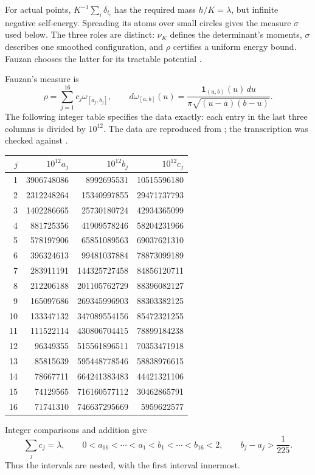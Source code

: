 For actual points, \(K^{-1}\sum_i\delta_{t_i}\) has the required mass
\(h/K=\lambda\), but infinite negative self-energy. Spreading its
atoms over small circles gives the measure \(\sigma\) used below.
The three roles are distinct: \(\nu_K\) defines the determinant's
moments, \(\sigma\) describes one smoothed configuration, and \(\rho\)
certifies a uniform energy bound. Fauzan chooses the latter for its
tractable potential \cite[after (6.4)]{fauzan}.

Fauzan's measure is
\[
 \rho=\sum_{j=1}^{16}c_j\omega_{[a_j,b_j]},\qquad
 d\omega_{[a,b]}(u)=\frac{\mathbf 1_{(a,b)}(u)\,du}
                         {\pi\sqrt{(u-a)(b-u)}}.
\]
The following integer table specifies the data exactly: each entry in
the last three columns is divided by \(10^{12}\).
The data are reproduced from \cite[Table 1]{fauzan}; the transcription
was checked against \cite[\texttt{Apery/Measure.lean},
\texttt{scripts/lemma61.py}]{firsching}.

\begin{center}
\small
\begin{tabular}{r r r r}
\(j\)&\(10^{12}a_j\)&\(10^{12}b_j\)&\(10^{12}c_j\)\\ \hline
1&3906748086&8992695531&10515596180\\
2&2312248264&15340997855&29471737793\\
3&1402286665&25730180724&42934365099\\
4&881725356&41909578246&58204231966\\
5&578197906&65851089563&69037621310\\
6&396324613&99481037884&78873099189\\
7&283911191&144325727458&84856120711\\
8&212206188&201105762729&88396082127\\
9&165097686&269345996903&88303382125\\
10&133347132&347089554156&85472321255\\
11&111522114&430806704415&78899184238\\
12&96349355&515561896511&70353471918\\
13&85815639&595448778546&58838976615\\
14&78667711&664241383483&44421321106\\
15&74129565&716160577112&30462865791\\
16&71741310&746637295669&5959622577
\end{tabular}
\end{center}

Integer comparisons and addition give
\begin{equation}\label{analytic:data-facts}
 \sum_jc_j=\lambda,\qquad
 0<a_{16}<\cdots<a_1<b_1<\cdots<b_{16}<2,\qquad
 b_j-a_j>\frac1{225}.
\end{equation}
Thus the intervals are nested, with the first interval innermost.

